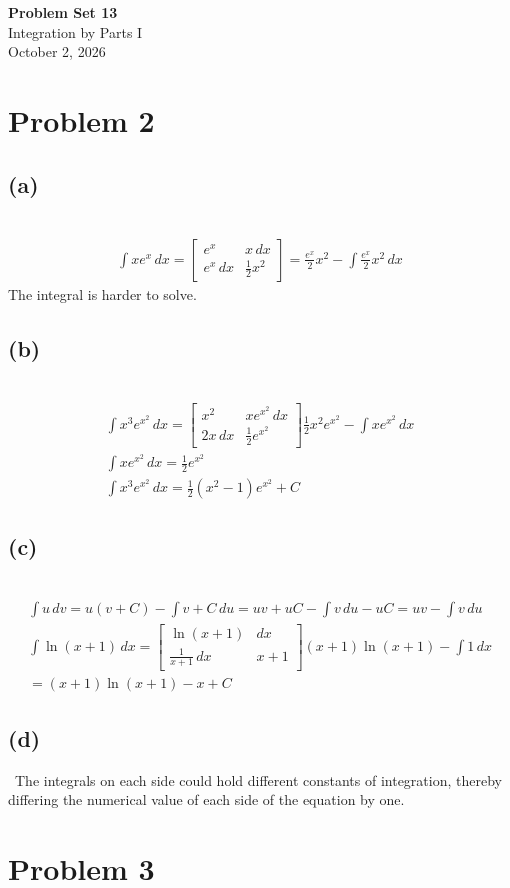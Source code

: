 \documentclass[12pt]{article}
\newcommand{\vem}{\vspace{0.5em}}
\newcommand{\problem}[1]{\section{Problem #1}}
\newcommand{\subproblem}[1]{\subsection{(#1)} \,}
\begin{document}
\vspace*{0cm}

\begin{center}
    {\Large \bfseries Problem Set 13} \\[0.5cm]
    {\large Integration by Parts I} \\[0.35cm]
    {\normalsize October 2, 2026}
\end{center}


\problem{2}

\subproblem{a}
\begin{gather*}
    \int xe^x\, dx = 
    \begin{bmatrix} e^x & x \,dx\\
    e^x \, dx& \frac{1}{2}x^2
    \end{bmatrix} = \frac{e^x}{2}x^2 - \int \frac{e^x}{2}x^2\, dx
\end{gather*}
The integral is harder to solve. \vem

\subproblem{b}
\begin{gather*}
    \int x^3 e^{x^2}\, dx =
    \begin{bmatrix}
        x^2 & xe^{x^2} \, dx\\
        2x\, dx & \frac{1}{2}e^{x^2}
    \end{bmatrix} 
    \frac{1}{2}x^2e^{x^2} - \int xe^{x^2} \, dx\\
    \int xe^{x^2} \, dx = \frac{1}{2}e^{x^2}\\
    \int x^3 e^{x^2}\, dx = \boxed{\frac{1}{2}(x^2-1)e^{x^2}+C}
\end{gather*}

\subproblem{c}
\begin{gather*}
    \int u\, dv = u(v+C) - \int v+C\, du=uv + uC - \int v \, du-uC = uv-\int v\, du\\
    \int \ln (x+1)\, dx= 
    \begin{bmatrix}
        \ln(x+1) & dx\\
        \frac{1}{x+1}\, dx & x+1
    \end{bmatrix}
    (x+1)\ln (x+1) - \int 1\, dx \\= \boxed{ (x+1)\ln (x+1)-x+C}
\end{gather*}

\subproblem{d}
The integrals on each side could hold different constants of integration, thereby differing the numerical value of each side of the equation by one.

\problem{3}
\end{document}
